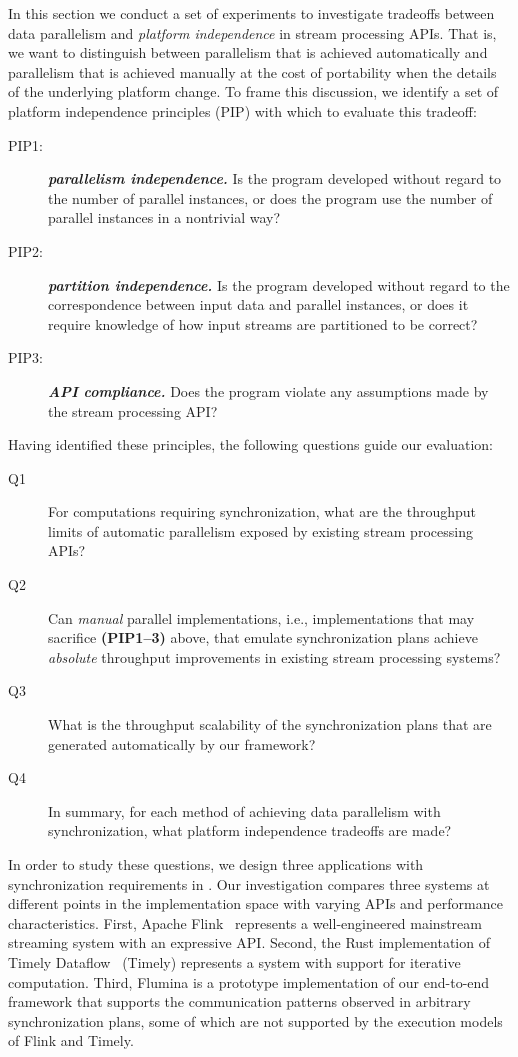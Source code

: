 In this section we conduct a set of experiments to investigate tradeoffs between data parallelism and \emph{platform independence} in stream processing APIs.
That is, we want to distinguish between parallelism that is achieved automatically and parallelism that is achieved manually at the cost of portability when the details of the underlying platform change.
To frame this discussion,
we identify a set of platform independence principles (PIP) with which to evaluate this tradeoff:
\begin{description}
\item[PIP1:] \textbf{\emph{parallelism independence.}}
    Is the program developed without regard to the number of parallel instances, or does the program use the number of parallel instances in a nontrivial way?
\item[PIP2:] \textbf{\emph{partition independence.}}
    Is the program developed without regard to the correspondence between input data and parallel instances, or does it require knowledge of how input streams are partitioned to be correct?
\item[PIP3:] \textbf{\emph{API compliance.}}
    Does the program violate any assumptions made by the stream processing API?
\end{description}
Having identified these principles, the following questions guide our evaluation:
\begin{description}
\item[Q1]
For computations requiring synchronization, what are the throughput limits of automatic parallelism exposed by existing stream processing APIs?
\item[Q2]
Can \emph{manual} parallel implementations, i.e., implementations that may sacrifice \textbf{(PIP1--3)} above, that emulate synchronization plans
achieve \emph{absolute} throughput improvements in existing stream processing systems?
\item[Q3]
What is the throughput scalability of the synchronization plans that are generated automatically by our framework?
\item[Q4]
In summary, for each method of achieving data parallelism with synchronization, what platform independence tradeoffs are made?
\end{description}
In order to study these questions, we design three applications with synchronization requirements in .
Our investigation compares three systems at different points
in the implementation space with varying APIs and performance characteristics.
First,
Apache Flink~\cite{Flink,Flink2015} represents a well-engineered mainstream streaming system with an expressive API.
Second, the Rust implementation of Timely Dataflow~\cite{Timely,Naiad2013} (Timely) represents a system with support for iterative computation.
Third, Flumina is a prototype implementation of our end-to-end framework that supports the communication patterns observed in arbitrary synchronization plans,
some of which are not supported by the execution models of Flink and Timely.


